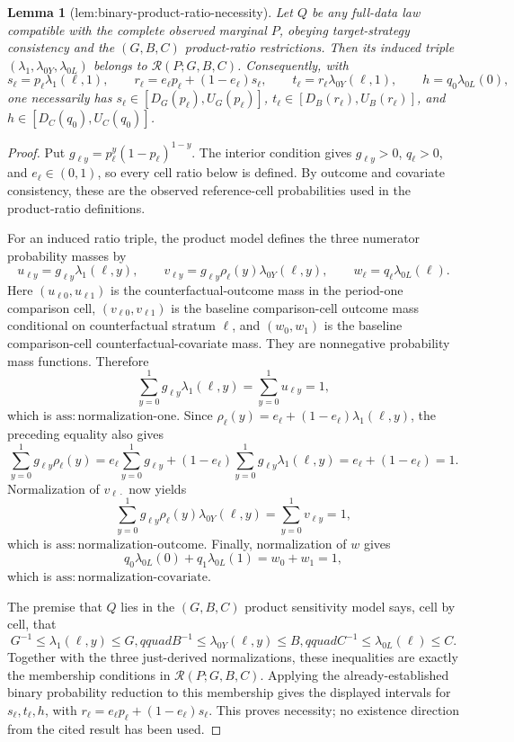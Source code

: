 \documentclass{article}
\newtheorem{lemma}{Lemma}
\begin{document}
\begin{lemma}[lem:binary-product-ratio-necessity]\label{lem:binary-product-ratio-necessity}
Let \(Q\) be any full-data law compatible with the complete observed marginal \(P\), obeying target-strategy consistency and the \((G,B,C)\) product-ratio restrictions. Then its induced triple \((\lambda_1,\lambda_{0Y},\lambda_{0L})\) belongs to \(\mathcal R(P;G,B,C)\). Consequently, with
\[
s_\ell=p_\ell\lambda_1(\ell,1),\qquad
r_\ell=e_\ell p_\ell+(1-e_\ell)s_\ell,\qquad
t_\ell=r_\ell\lambda_{0Y}(\ell,1),\qquad
h=q_0\lambda_{0L}(0),
\]
one necessarily has \(s_\ell\in[D_G(p_\ell),U_G(p_\ell)]\), \(t_\ell\in[D_B(r_\ell),U_B(r_\ell)]\), and \(h\in[D_C(q_0),U_C(q_0)]\).
\end{lemma}
\begin{proof}
Put \(g_{\ell y}=p_\ell^y(1-p_\ell)^{1-y}\). The interior condition gives \(g_{\ell y}>0\), \(q_\ell>0\), and \(e_\ell\in(0,1)\), so every cell ratio below is defined. By outcome and covariate consistency, these are the observed reference-cell probabilities used in the product-ratio definitions.

For an induced ratio triple, the product model defines the three numerator probability masses by
\[
u_{\ell y}=g_{\ell y}\lambda_1(\ell,y),\qquad
v_{\ell y}=g_{\ell y}\rho_\ell(y)\lambda_{0Y}(\ell,y),\qquad
w_\ell=q_\ell\lambda_{0L}(\ell).
\]
Here \((u_{\ell0},u_{\ell1})\) is the counterfactual-outcome mass in the period-one comparison cell, \((v_{\ell0},v_{\ell1})\) is the baseline comparison-cell outcome mass conditional on counterfactual stratum \(\ell\), and \((w_0,w_1)\) is the baseline comparison-cell counterfactual-covariate mass. They are nonnegative probability mass functions. Therefore
\[
\sum_{y=0}^1g_{\ell y}\lambda_1(\ell,y)
=\sum_{y=0}^1u_{\ell y}=1,
\]
which is \(\mathrm{ass{:}normalization\text{-}one}\). Since \(\rho_\ell(y)=e_\ell+(1-e_\ell)\lambda_1(\ell,y)\), the preceding equality also gives
\[
\sum_{y=0}^1g_{\ell y}\rho_\ell(y)
=e_\ell\sum_{y=0}^1g_{\ell y}
 +(1-e_\ell)\sum_{y=0}^1g_{\ell y}\lambda_1(\ell,y)
=e_\ell+(1-e_\ell)=1.
\]
Normalization of \(v_{\ell\cdot}\) now yields
\[
\sum_{y=0}^1g_{\ell y}\rho_\ell(y)\lambda_{0Y}(\ell,y)
=\sum_{y=0}^1v_{\ell y}=1,
\]
which is \(\mathrm{ass{:}normalization\text{-}outcome}\). Finally, normalization of \(w\) gives
\[
q_0\lambda_{0L}(0)+q_1\lambda_{0L}(1)=w_0+w_1=1,
\]
which is \(\mathrm{ass{:}normalization\text{-}covariate}\).

The premise that \(Q\) lies in the \((G,B,C)\) product sensitivity model says, cell by cell, that
\[
G^{-1}\leq\lambda_1(\ell,y)\leq G,qquad
B^{-1}\leq\lambda_{0Y}(\ell,y)\leq B,qquad
C^{-1}\leq\lambda_{0L}(\ell)\leq C.
\]
Together with the three just-derived normalizations, these inequalities are exactly the membership conditions in \(\mathcal R(P;G,B,C)\). Applying the already-established binary probability reduction to this membership gives the displayed intervals for \(s_\ell,t_\ell,h\), with \(r_\ell=e_\ell p_\ell+(1-e_\ell)s_\ell\). This proves necessity; no existence direction from the cited result has been used.
\end{proof}
\end{document}
